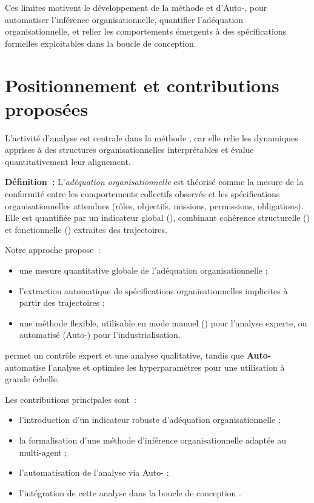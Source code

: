 Ces limites motivent le développement de la méthode  et d'Auto-, pour automatiser l'inférence organisationnelle, quantifier l'adéquation organisationnelle, et relier les comportements émergents à des spécifications formelles exploitables dans la boucle de conception.



\section{Positionnement et contributions proposées}
L'activité d'analyse est centrale dans la méthode , car elle relie les dynamiques apprises à des structures organisationnelles interprétables et évalue quantitativement leur alignement.

\textbf{Définition~:} L'\textit{adéquation organisationnelle} est théorisé comme la mesure de la conformité entre les comportements collectifs observés et les spécifications organisationnelles attendues (rôles, objectifs, missions, permissions, obligations). Elle est quantifiée par un indicateur global (\textbf{}), combinant cohérence structurelle () et fonctionnelle () extraites des trajectoires.

Notre approche propose~:
\begin{itemize}
  \item une mesure quantitative globale de l'adéquation organisationnelle  ;
  \item l'extraction automatique de spécifications organisationnelles implicites à partir des trajectoires ;
  \item une méthode flexible, utilisable en mode manuel () pour l'analyse experte, ou automatisé (Auto-) pour l'industrialisation.
\end{itemize}

 permet un contrôle expert et une analyse qualitative, tandis que \textbf{Auto-} automatise l'analyse et optimise les hyperparamètres pour une utilisation à grande échelle.

Les contributions principales sont~:
\begin{itemize}
  \item l'introduction d'un indicateur robuste d'adéquation organisationnelle ;
  \item la formalisation d'une méthode d'inférence organisationnelle adaptée au multi-agent ;
  \item l'automatisation de l'analyse via Auto- ;
  \item l'intégration de cette analyse dans la boucle de conception .
\end{itemize}

